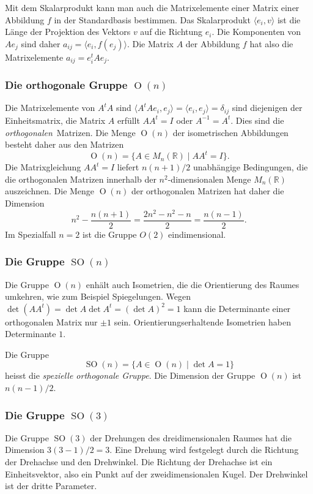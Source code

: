 Mit dem Skalarprodukt kann man auch die Matrixelemente einer Matrix
einer Abbildung $f$ in der Standardbasis bestimmen.
Das Skalarprodukt $\langle e_i, v\rangle$ ist die Länge der Projektion
des Vektors $v$ auf die Richtung $e_i$.
Die Komponenten von $Ae_j$ sind daher $a_{ij}=\langle e_i,f(e_j)\rangle$.
Die Matrix $A$ der Abbildung $f$ hat also die Matrixelemente
$a_{ij}=e_i^tAe_j$.

\subsubsection{Die orthogonale Gruppe $\operatorname{O}(n)$}
Die Matrixelemente von $A^tA$ sind
$\langle A^tAe_i, e_j\rangle =\langle e_i,e_j\rangle = \delta_{ij}$
sind diejenigen der Einheitsmatrix,
die Matrix $A$ erfüllt $AA^t=I$ oder $A^{-1}=A^t$.
Dies sind die {\em orthogonalen} Matrizen.
Die Menge $\operatorname{O}(n)$ der isometrischen Abbildungen besteht
daher aus den Matrizen
\[
\operatorname{O}(n)
=
\{ A\in M_n(\mathbb{R})\;|\; AA^t=I\}.
\]
Die Matrixgleichung $AA^t=I$ liefert $n(n+1)/2$ unabhängige Bedingungen,
die die orthogonalen Matrizen innerhalb der $n^2$-dimensionalen
Menge $M_n(\mathbb{R})$ auszeichnen.
Die Menge $\operatorname{O}(n)$ der orthogonalen Matrizen hat daher
die Dimension
\[
n^2 - \frac{n(n+1)}{2}
=
\frac{2n^2-n^2-n}{2}
=
\frac{n(n-1)}2.
\]
Im Spezialfall $n=2$ ist die Gruppe $O(2)$ eindimensional.

\subsubsection{Die Gruppe $\operatorname{SO}(n)$}
Die Gruppe $\operatorname{O}(n)$ enhält auch Isometrien, die
die Orientierung des Raumes umkehren, wie zum Beispiel Spiegelungen.
Wegen $\det (AA^t)=\det A\det A^t = (\det A)^2=1$ kann die Determinante
einer orthogonalen Matrix nur $\pm 1$ sein.
Orientierungserhaltende Isometrien haben Determinante $1$.

Die Gruppe
\[
\operatorname{SO}(n)
=
\{A\in\operatorname{O}(n)\;|\; \det A=1\}
\]
heisst die {\em spezielle orthogonale Gruppe}.
Die Dimension der Gruppe $\operatorname{O}(n)$ ist $n(n-1)/2$.

\subsubsection{Die Gruppe $\operatorname{SO}(3)$}
Die Gruppe $\operatorname{SO}(3)$ der Drehungen des dreidimensionalen
Raumes hat die Dimension $3(3-1)/2=3$.
Eine Drehung wird festgelegt durch die Richtung der Drehachse und den
Drehwinkel.
Die Richtung der Drehachse ist ein Einheitsvektor, also ein Punkt
auf der zweidimensionalen Kugel.
Der Drehwinkel ist der dritte Parameter.

